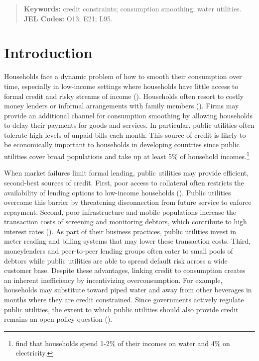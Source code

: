 \documentclass[12pt]{article}
\begin{document}
\begin{titlepage}
\begin{abstract}
\vspace{2in}
\textbf{Keywords:} credit constraints; consumption smoothing; water utilities. \\
\textbf{JEL Codes:} O13; E21; L95. \\
\bigskip
\end{abstract}
\setcounter{page}{0}
\thispagestyle{empty}
\end{titlepage}
\pagebreak \newpage

\onehalfspacing

\section{Introduction}

Households face a dynamic problem of how to smooth their consumption over time, especially in low-income settings where households have little access to formal credit and risky streams of income (\cite{morduch1995income}).  Households often resort to costly money lenders or informal arrangements with family members (\cite{banerjee2007economic}).  Firms may provide an additional channel for consumption smoothing by allowing households to delay their payments for goods and services.  In particular, public utilities often tolerate high levels of unpaid bills each month.  This source of credit is likely to be economically important to households in developing countries since public utilities cover broad populations and take up at least 5\% of household incomes.\footnote{\cite{komives2006distributional} find that households spend 1-2\% of their incomes on water and 4\% on electricity.} 

When market failures limit formal lending, public utilities may provide efficient, second-best sources of credit.  First, poor access to collateral often restricts the availability of lending options to low-income households (\cite{jack2016borrowing}).  Public utilities overcome this barrier by threatening disconnection from future service to enforce repayment.  Second, poor infrastructure and mobile populations increase the transaction costs of screening and monitoring debtors, which contribute to high interest rates (\cite{jack2014risk}).  As part of their business practices, public utilities invest in meter reading and billing systems that may lower these transaction costs.  Third, moneylenders and peer-to-peer lending groups often cater to small pools of debtors while public utilities are able to spread default risk across a wide customer base.  Despite these advantages, linking credit to consumption creates an inherent inefficiency by incentivizing overconsumption.  For example, households may substitute toward piped water and away from other beverages in months where they are credit constrained.  Since governments actively regulate public utilities, the extent to which public utilities should also provide credit remains an open policy question (\cite{laffont2005regulation}).  
\end{document}
